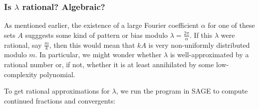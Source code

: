 \documentclass{article}
\theoremstyle{definition}
\theoremstyle{remark}
\numberwithin{equation}{section}
\begin{document}
\subsubsection{Is $\lambda$ rational?  Algebraic?}

As mentioned earlier, the existence of a large Fourier coefficient
$\alpha$ for one of these sets $A$ sugggests some kind of pattern or
bias modulo $\lambda = \frac{2\pi}{\alpha}$.  If this $\lambda$ were
rational, say $\frac{m}{k}$, then this would mean that $kA$ is very
non-uniformly distributed modulo $m$.  In particular, we might wonder
whether $\lambda$ is well-approximated by a rational number or, if
not, whether it is at least annihilated by some low-complexity
polynomial.  

To get rational approximations for $\lambda$, we run the program
 in SAGE to compute continued fractions and
convergents:
\end{document}
